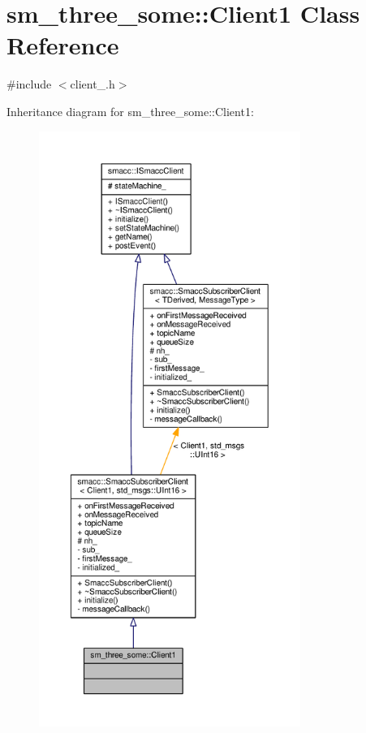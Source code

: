 \hypertarget{classsm__three__some_1_1Client1}{}\section{sm\+\_\+three\+\_\+some\+:\+:Client1 Class Reference}
\label{classsm__three__some_1_1Client1}


{\ttfamily \#include $<$client\+\_.\+h$>$}



Inheritance diagram for sm\+\_\+three\+\_\+some\+:\+:Client1\+:
\nopagebreak
\begin{figure}[H]
\begin{center}
\leavevmode
\includegraphics[height=550pt]{classsm__three__some_1_1Client1__inherit__graph}
\end{center}
\end{figure}


